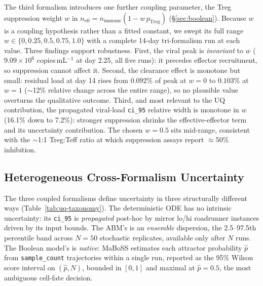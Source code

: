 \documentclass[conference,letterpaper,10pt]{IEEEtran}
\begin{document}
The third formalism introduces one further coupling parameter, the Treg
suppression weight $w$ in
$n_{\text{eff}}=n_{\text{immune}}(1-w\,p_{\text{Treg}})$
(\S\ref{sec:boolean}). Because $w$ is a coupling hypothesis rather than a fitted constant, we swept
its full range $w\in\{0,0.25,0.5,0.75,1.0\}$ with a complete 14-day
tri-formalism run at each value. Three findings support robustness. First,
the viral peak is \emph{invariant} to $w$ ($9.09\times10^{6}$
copies\,mL$^{-1}$ at day 2.25, all five runs): it precedes effector
recruitment, so suppression cannot affect it. Second, the clearance effect
is monotone but small: residual load at day 14 rises from $0.092\%$ of peak
at $w{=}0$ to $0.103\%$ at $w{=}1$ ($\sim$12\% relative change across the
entire range), so no plausible value overturns the qualitative outcome.
Third, and most relevant to the UQ contribution, the propagated viral-load
\texttt{ci\_95} relative width is monotone in $w$ (16.1\% down to 7.2\%):
stronger suppression shrinks the effective-effector term and its uncertainty
contribution. The chosen $w{=}0.5$ sits mid-range, consistent with the
$\sim$1:1 Treg:Teff ratio at which suppression assays report $\approx$50\%
inhibition.

\subsection{Heterogeneous Cross-Formalism Uncertainty}
\label{sec:xf-uq}

The three coupled formalisms define uncertainty in three structurally
different ways (Table~\ref{tab:uq-taxonomy}). The deterministic ODE has no
intrinsic uncertainty: its \texttt{ci\_95} is \emph{propagated} post-hoc by
mirror lo/hi roadrunner instances driven by its input bounds. The ABM's is
an \emph{ensemble} dispersion, the 2.5--97.5th percentile band across
$N\!=\!50$ stochastic replicates, available only after $N$ runs. The
Boolean model's is \emph{native}: MaBoSS estimates each attractor
probability $\hat p$ from \texttt{sample\_count} trajectories within a
single run, reported as the 95\% Wilson score interval on $(\hat p, N)$,
bounded in $[0,1]$ and maximal at $\hat p = 0.5$, the most ambiguous
cell-fate decision.
\end{document}
